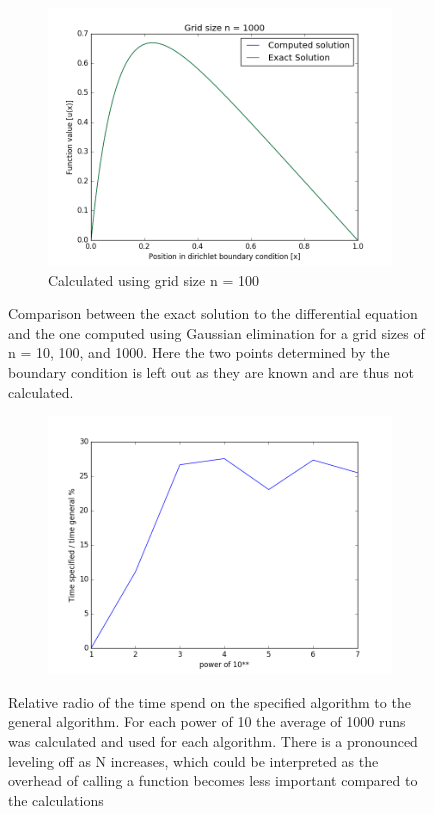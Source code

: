 \documentclass[a4paper,11pt]{article}
\begin{document}
{\begin{figure}[H]
\begin{subfigure}[b]{0.3\textwidth}
		\includegraphics[scale=0.3]{n=1000}
		\caption{Calculated using grid size n = 100}
		\label{fig:n=1000}
	\end{subfigure}
	\caption{Comparison between the exact solution to the differential equation and the one computed using Gaussian elimination for a grid sizes of n = 10, 100, and 1000. Here the two points determined by the boundary condition is left out as they are known and are thus not calculated.}
	\label{fig:exact_vs_calculated}
\end{figure}

\begin{figure}
	\centering
	\begin{subfigure}{0.3\textwidth}
		\includegraphics[scale=0.5]{Time_relative}
	\end{subfigure}
	\label{fig:Time_relative}
	\caption{Relative radio of the time spend on the specified algorithm to the general algorithm. For each power of 10 the average of 1000 runs was calculated and used for each algorithm. There is a pronounced leveling off as N increases, which could be interpreted as the overhead of calling a function becomes less important compared to the calculations}
\end{figure}

}
\end{document}
